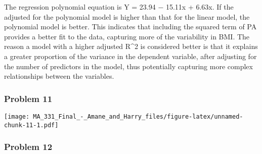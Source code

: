 \documentclass[
]{article}
\newenvironment{Shaded}{\begin{snugshade}}{\end{snugshade}}
\newcommand{\AttributeTok}[1]{\textcolor[rgb]{0.13,0.29,0.53}{#1}}
\newcommand{\DecValTok}[1]{\textcolor[rgb]{0.00,0.00,0.81}{#1}}
\newcommand{\FunctionTok}[1]{\textcolor[rgb]{0.13,0.29,0.53}{\textbf{#1}}}
\newcommand{\NormalTok}[1]{#1}
\newcommand{\OtherTok}[1]{\textcolor[rgb]{0.56,0.35,0.01}{#1}}
\newcommand{\SpecialCharTok}[1]{\textcolor[rgb]{0.81,0.36,0.00}{\textbf{#1}}}
\newcommand{\StringTok}[1]{\textcolor[rgb]{0.31,0.60,0.02}{#1}}
\begin{document}
The regression polynomial equation is Y = 23.94 − 15.11x + 6.63x. If the
adjusted for the polynomial model is higher than that for the linear
model, the polynomial model is better. This indicates that including the
squared term of PA provides a better fit to the data, capturing more of
the variability in BMI. The reason a model with a higher adjusted R\^{}2
is considered better is that it explains a greater proportion of the
variance in the dependent variable, after adjusting for the number of
predictors in the model, thus potentially capturing more complex
relationships between the variables.

\hypertarget{problem-11}{%
\subsubsection{Problem 11}\label{problem-11}}

\begin{Shaded}
\end{Shaded}

\texttt{[image: MA\_331\_Final\_-\_Amane\_and\_Harry\_files/figure-latex/unnamed-chunk-11-1.pdf]}

\hypertarget{problem-12}{%
\subsubsection{Problem 12}\label{problem-12}}
\end{document}

